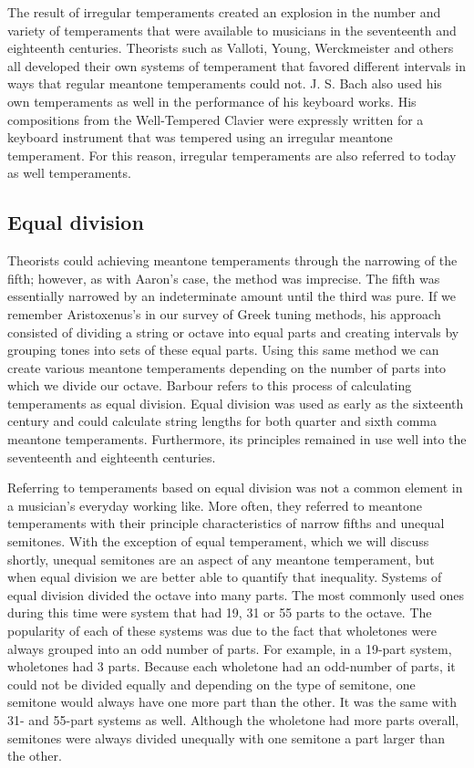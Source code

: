 The result of irregular temperaments created an explosion in the number and
variety of temperaments that were available to musicians in the seventeenth and
eighteenth centuries.  Theorists such as Valloti, Young, Werckmeister and others
all developed their own systems of temperament that favored different intervals
in ways that regular meantone temperaments could not.  J. S. Bach also used his
own temperaments as well in the performance of his keyboard works.  His
compositions from the Well-Tempered Clavier were expressly written for a
keyboard instrument that was tempered using an irregular meantone temperament.
For this reason, irregular temperaments are also referred to today as well
temperaments.

\subsection{Equal division}

Theorists could achieving meantone temperaments through the narrowing of the fifth;
however, as with Aaron's case, the method was imprecise.  The fifth was essentially
narrowed by an indeterminate amount until the third was pure. If we remember Aristoxenus's
in our survey of Greek tuning methods, his approach consisted of dividing a string or
octave into equal parts and creating intervals by grouping tones into sets of these equal
parts. Using this same method we can create various meantone temperaments depending on the
number of parts into which we divide our octave.  Barbour refers to this process of
calculating temperaments as equal division. Equal division was used as early as the
sixteenth century and could calculate string lengths for both quarter and sixth comma
meantone temperaments. Furthermore, its principles remained in use well into the
seventeenth and eighteenth centuries.

Referring to temperaments based on equal division was not a common element in a musician's
everyday working like. More often, they referred to meantone temperaments with their
principle characteristics of narrow fifths and unequal semitones.  With the exception of
equal temperament, which we will discuss shortly, unequal semitones are an aspect of any
meantone temperament, but when equal division we are better able to quantify that
inequality.  Systems of equal division divided the octave into many parts.  The most
commonly used ones during this time were system that had 19, 31 or 55 parts to the octave.
 The popularity of each of these systems was due to the fact that wholetones were always
grouped into an odd number of parts.  For example, in a 19-part system, wholetones had 3
parts.  Because each wholetone had an odd-number of parts, it could not be divided equally
and depending on the type of semitone, one semitone would always have one more part than
the other.  It was the same with 31- and 55-part systems as well.  Although the wholetone
had more parts overall, semitones were always divided unequally with one semitone a part
larger than the other.

